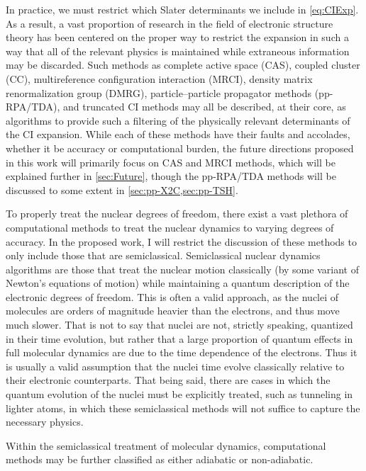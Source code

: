 \documentclass[12pt]{article}
\begin{document}
In practice, we  must restrict which Slater determinants we include in
\cref{eq:CIExp}. As a result, a vast proportion of research in the field of
electronic structure theory has been centered on the proper way to restrict the
expansion in such a way that all of the relevant physics is maintained while
extraneous information may be discarded. Such methods as complete active space
(CAS), coupled cluster (CC), multireference configuration interaction (MRCI),
density matrix renormalization group (DMRG), particle--particle propagator
methods (pp-RPA/TDA), and truncated CI methods may all be described, at their
core, as algorithms to provide such a filtering of the physically relevant
determinants of the CI expansion. While each of these methods have their faults
and accolades, whether it be accuracy or computational burden, the future
directions proposed in this work will primarily focus on CAS and MRCI methods,
which will be explained further in \cref{sec:Future}, though the pp-RPA/TDA
methods will be discussed to some extent in \cref{sec:pp-X2C,sec:pp-TSH}.

To properly treat the nuclear degrees of freedom, there exist a vast plethora
of computational methods to treat the nuclear dynamics to varying degrees of
accuracy. In the proposed work, I will restrict the discussion of these methods
to only include those that are semiclassical. Semiclassical nuclear dynamics
algorithms are those that treat the nuclear motion classically (by some variant
of Newton's equations of motion) while maintaining a quantum description of the
electronic degrees of freedom. This is often a valid approach, as the nuclei of
molecules are orders of magnitude heavier than the electrons, and thus move much
slower. That is not to say that nuclei are not, strictly speaking, quantized in
their time evolution, but rather that a large proportion of quantum effects in
full molecular dynamics are due to the time dependence of the electrons. Thus it
is usually a valid assumption that the nuclei time evolve classically relative to
their electronic counterparts. That being said, there are cases in which the
quantum evolution of the nuclei must be explicitly treated, such as tunneling in
lighter atoms, in which these semiclassical methods will not suffice to capture
the necessary physics.

Within the semiclassical treatment of molecular dynamics, computational methods
may be further classified as either adiabatic or non-adiabatic. 
\end{document}
